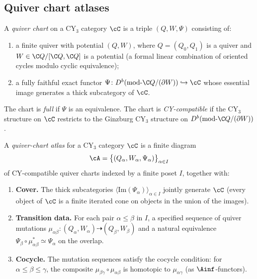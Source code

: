 \subsection{Quiver chart atlases}
\label{subsec:quiver-chart-atlas}

\begin{definition}
\label{def:quiver-chart}
A \emph{quiver chart} on a CY$_3$ category $\cC$ is a triple $(Q, W, \Psi)$ consisting of:
\begin{enumerate}[label=(\roman*)]
 \item a finite quiver with potential $(Q, W)$, where $Q = (Q_0, Q_1)$ is a quiver and $W \in \C Q / [\C Q, \C Q]$ is a potential (a formal linear combination of oriented cycles modulo cyclic equivalence);
 \item a fully faithful exact functor $\Psi \colon D^b(\mathrm{mod}\text{-}\C Q / (\partial W)) \hookrightarrow \cC$ whose essential image generates a thick subcategory of $\cC$.
\end{enumerate}
The chart is \emph{full} if $\Psi$ is an equivalence. The chart is \emph{CY-compatible} if the CY$_3$ structure on $\cC$ restricts to the Ginzburg CY$_3$ structure on $D^b(\mathrm{mod}\text{-}\C Q / (\partial W))$.
\end{definition}

\begin{definition}
\label{def:quiver-chart-atlas}
A \emph{quiver-chart atlas} for a CY$_3$ category $\cC$ is a finite diagram
\[
 \cA = \bigl\{(Q_\alpha, W_\alpha, \Psi_\alpha)\bigr\}_{\alpha \in I}
\]
of CY-compatible quiver charts indexed by a finite poset $I$, together with:
\begin{enumerate}[label=(\roman*)]
 \item \textbf{Cover.} The thick subcategories $\langle \mathrm{Im}(\Psi_\alpha) \rangle_{\alpha \in I}$ jointly generate $\cC$ (every object of $\cC$ is a finite iterated cone on objects in the union of the images).
 \item \textbf{Transition data.} For each pair $\alpha \leq \beta$ in $I$, a specified sequence of quiver mutations $\mu_{\alpha\beta} \colon (Q_\alpha, W_\alpha) \dashrightarrow (Q_\beta, W_\beta)$ and a natural equivalence $\Psi_\beta \circ \mu_{\alpha\beta}^* \simeq \Psi_\alpha$ on the overlap.
 \item \textbf{Cocycle.} The mutation sequences satisfy the cocycle condition: for $\alpha \leq \beta \leq \gamma$, the composite $\mu_{\beta\gamma} \circ \mu_{\alpha\beta}$ is homotopic to $\mu_{\alpha\gamma}$ (as $\Ainf$-functors).
\end{enumerate}
\end{definition}


